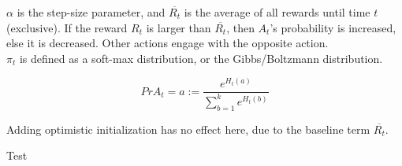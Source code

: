 \documentclass[a4paper]{article}
\begin{document}
$\alpha$ is the step-size parameter, and $\overline{R_t}$ is the average of all rewards until time $t$ (exclusive). If the reward $R_t$ is larger than $\overline{R_t}$, then $A_t$'s probability is increased, else it is decreased. Other actions engage with the opposite action.\\

$\pi_t$ is defined as a soft-max distribution, or the Gibbs/Boltzmann distribution.

$$Pr{A_t = a} := \frac{e^{H_t(a)}}{\sum_{b=1}^ke^{H_t(b)}}$$

Adding optimistic initialization has no effect here, due to the baseline term $\overline{R_t}$.

Test
\end{document}
